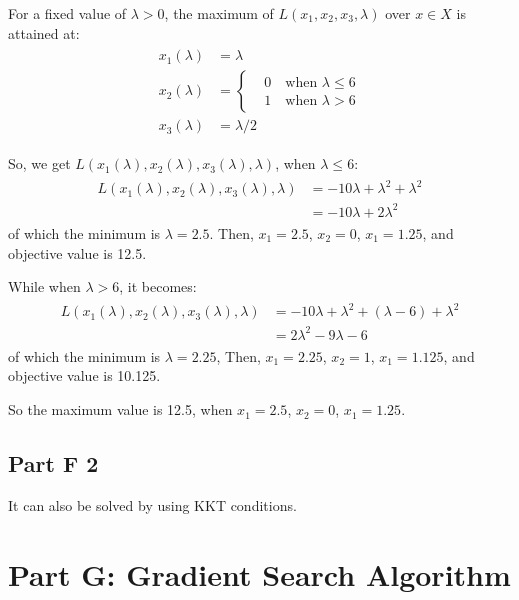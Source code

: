 \documentclass[fleqn,10pt]{wlscirep}
\begin{document}
For a fixed value of $\lambda > 0$, the maximum of $L(x_{1}, x_{2}, x_{3}, \lambda)$ over $x \in X$ is attained at:
\begin{align} \begin{split}
    x_{1}(\lambda) &= \lambda \\
    x_{2}(\lambda) &= \begin{cases}
        & 0 \quad \text{when  } \lambda \leq 6 \\
        & 1 \quad \text{when  } \lambda > 6
    \end{cases} \\
    x_{3}(\lambda) &= \lambda / 2
\end{split} \end{align} 

So, we get $L(x_{1}(\lambda), x_{2}(\lambda), x_{3}(\lambda), \lambda)$, when $\lambda \leq 6$:
\begin{align} \begin{split}
    L(x_{1}(\lambda), x_{2}(\lambda), x_{3}(\lambda), \lambda) &= - 10 \lambda + \lambda^2 + \lambda^2 \\
    &= - 10 \lambda + 2 \lambda^2
\end{split} \end{align} 
of which the minimum is $\lambda = 2.5$. Then, $x_{1} = 2.5$, $x_{2} = 0$, $x_{1} = 1.25$, and objective value is 12.5.

While when $\lambda > 6$, it becomes:
\begin{align} \begin{split}
    L(x_{1}(\lambda), x_{2}(\lambda), x_{3}(\lambda), \lambda) &= - 10 \lambda + \lambda^2 + (\lambda - 6) + \lambda^2 \\
    &= 2 \lambda^2 - 9 \lambda - 6
\end{split} \end{align} 
of which the minimum is $\lambda = 2.25$, Then, $x_{1} = 2.25$, $x_{2} = 1$, $x_{1} = 1.125$, and objective value is 10.125.

So the maximum value is 12.5, when $x_{1} = 2.5$, $x_{2} = 0$, $x_{1} = 1.25$.

\subsection{Part F 2}

It can also be solved by using KKT conditions.

\section{Part G: Gradient Search Algorithm}
\end{document}
